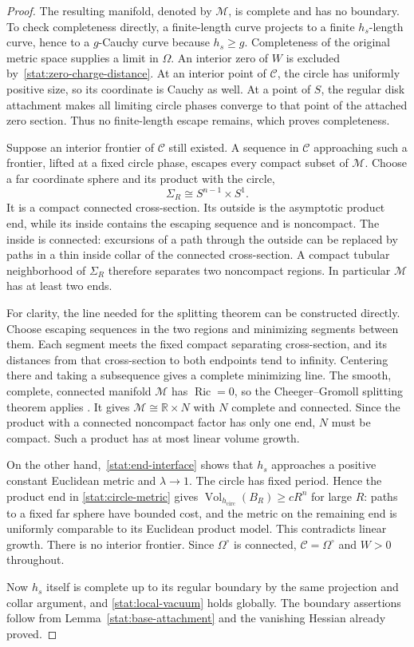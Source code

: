 \begin{proof}
The resulting manifold, denoted by $\mathcal M$, is complete and
has no boundary.  To check completeness directly, a finite-length
curve projects to a finite $h_s$-length curve, hence to a
$g$-Cauchy curve because $h_s\geq g$.  Completeness of the original
metric space supplies a limit in $\Omega$.  An interior zero of
$W$ is excluded by~\eqref{stat:zero-charge-distance}.  At an
interior point of $\mathcal C$, the circle has uniformly positive
size, so its coordinate is Cauchy as well.  At a point of $S$, the
regular disk attachment makes all limiting circle phases converge
to that point of the attached zero section.  Thus no finite-length
escape remains, which proves completeness.

Suppose an interior frontier of $\mathcal C$ still existed.  A
sequence in $\mathcal C$ approaching such a frontier, lifted at a
fixed circle phase, escapes every compact subset of $\mathcal M$.
Choose a far coordinate sphere and its product with the circle,
\[
 \Sigma_R\cong S^{n-1}\times S^1.
\]
It is a compact connected cross-section.  Its outside is the
asymptotic product end, while its inside contains the escaping
sequence and is noncompact.  The inside is connected: excursions
of a path through the outside can be replaced by paths in a thin
inside collar of the connected cross-section.  A compact tubular
neighborhood of $\Sigma_R$ therefore separates two noncompact
regions.  In particular $\mathcal M$ has at least two ends.

For clarity, the line needed for the splitting theorem can be
constructed directly.  Choose escaping sequences in the two
regions and minimizing segments between them.  Each segment meets
the fixed compact separating cross-section, and its distances from
that cross-section to both endpoints tend to infinity.  Centering
there and taking a subsequence gives a complete minimizing line.
The smooth, complete, connected manifold $\mathcal M$ has
$\operatorname{Ric}=0$, so the Cheeger--Gromoll splitting theorem
applies \cite{CheegerGromoll1971}.  It gives
$\mathcal M\cong\mathbb R\times N$ with $N$ complete and
connected.  Since the product with a connected noncompact factor
has only one end, $N$ must be compact.  Such a product has at most
linear volume growth.

On the other hand,~\eqref{stat:end-interface} shows that $h_s$
approaches a positive constant Euclidean metric and $\lambda\to1$.
The circle has fixed period.  Hence the product end in
\eqref{stat:circle-metric} gives
$\operatorname{Vol}_{h_{\mathrm{circ}}}(B_R)\geq cR^n$ for large
$R$: paths to a fixed far sphere have bounded cost, and the metric
on the remaining end is uniformly comparable to its Euclidean
product model.  This contradicts linear growth.  There is no
interior frontier.  Since $\Omega^\circ$ is connected,
$\mathcal C=\Omega^\circ$ and $W>0$ throughout.

Now $h_s$ itself is complete up to its regular boundary by the
same projection and collar argument, and
\eqref{stat:local-vacuum} holds globally.  The boundary assertions
follow from Lemma~\ref{stat:base-attachment} and the vanishing
Hessian already proved.
\end{proof}


